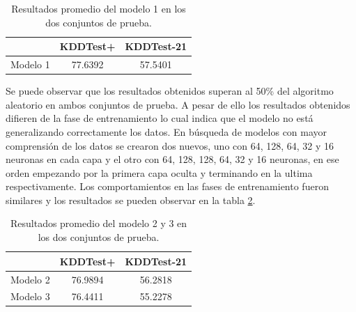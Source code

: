 \begin{table}[b!]
    \begin{center}
        \caption{Resultados promedio del modelo 1 en los dos conjuntos de prueba.}

        \label{tab:model1_results}
        \begin{tabular}{c|c|c} %
        \textbf{} & \textbf{KDDTest+} & \textbf{KDDTest-21}\\
        \hline
        Modelo 1 & 77.6392 & 57.5401\\
        \end{tabular}
    \end{center}
\end{table}

Se puede observar que los resultados obtenidos superan al 50\% del algoritmo aleatorio en ambos conjuntos de prueba. A pesar de ello los resultados obtenidos difieren de la fase de entrenamiento lo cual indica que el modelo no está generalizando correctamente los datos. En búsqueda de modelos con mayor comprensión de los datos se crearon dos nuevos, uno con 64, 128, 64, 32 y 16 neuronas en cada capa y el otro con 64, 128, 128, 64, 32 y 16 neuronas, en ese orden empezando por la primera capa oculta y terminando en la ultima respectivamente. Los comportamientos en las fases de entrenamiento fueron similares y los resultados se pueden observar en la tabla \ref{tab:model23_results}.

\begin{table}[t!]
    \begin{center}
        \caption{Resultados promedio del modelo 2 y 3 en los dos conjuntos de prueba.}

        \label{tab:model23_results}
        \begin{tabular}{c|c|c} %
        \textbf{} & \textbf{KDDTest+} & \textbf{KDDTest-21}\\
        \hline
        Modelo 2 & 76.9894 & 56.2818\\
        Modelo 3 & 76.4411 & 55.2278\\
        \end{tabular}
    \end{center}
\end{table}



